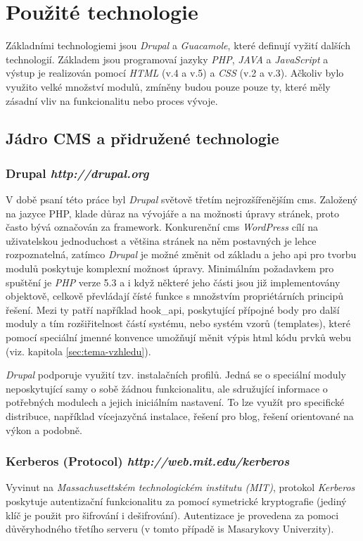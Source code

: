 \section{Použité technologie}
\label{sec:technologies}

Základními technologiemi jsou \emph{Drupal} a \emph{Guacamole}, které definují vyžití dalších technologií. Základem jsou programovaí jazyky \emph{PHP}, \emph{JAVA} a \emph{JavaScript} a výstup je realizován pomocí \emph{HTML} (v.4 a v.5) a \emph{CSS} (v.2 a v.3). Ačkoliv bylo využito velké množství modulů, zmíněny budou pouze pouze ty, které měly zásadní vliv na funkcionalitu nebo proces vývoje.

\subsection{Jádro CMS a přidružené technologie}

\subsubsection*{\textbf{Drupal} \hfill \emph{http://drupal.org}} 
\label{subsec:drupal}
V době psaní této práce byl \emph{Drupal} světově třetím nejrozšířenějším \gls{cms}\cite{website:cms-market-share}. Založený na jazyce PHP, klade důraz na vývojáře a na možnosti úpravy stránek, proto často bývá označován za \gls{framework}. Konkurenční \gls{cms} \emph{WordPress} cílí na uživatelskou jednoduchost a většina stránek na něm postavných je lehce rozpoznatelná, zatímco \emph{Drupal} je možné změnit od základu a jeho \gls{api} pro tvorbu modulů poskytuje komplexní možnost úpravy. Minimálním požadavkem pro spuštění je \emph{PHP} verze 5.3 a i když některé jeho části jsou již implementovány objektově, celkově převládají čísté funkce s množstvím propriétárních principů řešení. Mezi ty patří například hook\_api, poskytující přípojné body pro další moduly a tím rozšiřitelnost částí systému, nebo systém vzorů (templates), které pomocí speciální jmenné konvence umožňují měnit výpis html kódu prvků webu (viz. kapitola \ref{sec:tema-vzhledu}).

\emph{Drupal} podporuje využití tzv. instalačních profilů. Jedná se o speciální moduly neposkytující samy o sobě žádnou funkcionalitu, ale sdružující informace o potřebných modulech a jejich iniciálním nastavení. To lze využít pro specifické distribuce, například vícejazyčná instalace, řešení pro blog, řešení orientované na výkon a podobně.

\subsubsection*{\textbf{Kerberos} (Protocol) \hfill \emph{http://web.mit.edu/kerberos}}
Vyvinut na \emph{Massachusettském technologickém institutu (MIT)}, protokol \emph{Kerberos} poskytuje autentizační funkcionalitu za pomocí symetrické kryptografie (jediný klíč je použit pro šifrování i dešifrování). Autentizace je provedena za pomoci důvěryhodného třetího serveru (v tomto případě \gls{is} Masarykovy Univerzity).

